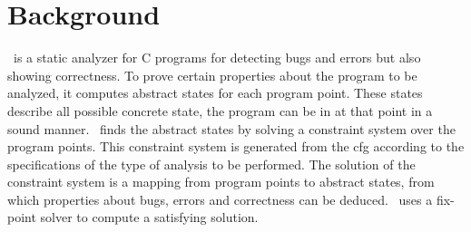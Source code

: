 \section{Background}
\label{sec:background}
\gob\ is a static analyzer for C programs for detecting bugs and errors but also showing correctness. To prove certain properties about the program to be analyzed, it computes abstract states for each program point. These states describe all possible concrete state, the program can be in at that point in a sound manner. \gob\ finds the abstract states by solving a constraint system over the program points. This constraint system is generated from the \ac{cfg} according to the specifications of the type of analysis to be performed. The solution of the constraint system is a mapping from program points to abstract states, from which properties about bugs, errors and correctness can be deduced. \gob\ uses a fix-point solver to compute a satisfying solution.

